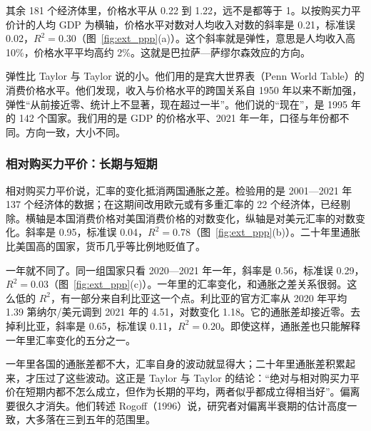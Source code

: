 其余 181 个经济体里，价格水平从 0.22 到 1.22，远不是都等于 1。以按购买力平价计的人均 GDP 为横轴，价格水平对数对人均收入对数的斜率是 0.21，标准误 0.02，$R^{2}=0.30$（图~\ref{fig:ext_ppp}(a)）。这个斜率就是弹性，意思是人均收入高 10\%，价格水平平均高约 2\%。这就是巴拉萨—萨缪尔森效应的方向。

弹性比 Taylor 与 Taylor 说的小。他们用的是宾大世界表（Penn World Table）的消费价格水平。他们发现，收入与价格水平的跨国关系自 1950 年以来不断加强，弹性“从前接近零、统计上不显著，现在超过一半”。他们说的“现在”，是 1995 年的 142 个国家\cite{taylor2004}。我们用的是 GDP 的价格水平、2021 年一年，口径与年份都不同。方向一致，大小不同。

\subsubsection{相对购买力平价：长期与短期}
相对购买力平价说，汇率的变化抵消两国通胀之差。检验用的是 2001—2021 年 137 个经济体的数据；在这期间改用欧元或有多重汇率的 22 个经济体，已经剔除。横轴是本国消费价格对美国消费价格的对数变化，纵轴是对美元汇率的对数变化。斜率是 0.95，标准误 0.04，$R^{2}=0.78$（图~\ref{fig:ext_ppp}(b)）。二十年里通胀比美国高的国家，货币几乎等比例地贬值了。

一年就不同了。同一组国家只看 2020—2021 年一年，斜率是 0.56，标准误 0.29，$R^{2}=0.03$（图~\ref{fig:ext_ppp}(c)）\cite{wdi2026}。一年里的汇率变化，和通胀之差关系很弱。这么低的 $R^{2}$，有一部分来自利比亚这一个点。利比亚的官方汇率从 2020 年平均 1.39 第纳尔/美元调到 2021 年的 4.51，对数变化 1.18。它的通胀差却接近零。去掉利比亚，斜率是 0.65，标准误 0.11，$R^{2}=0.20$。即使这样，通胀差也只能解释一年里汇率变化的五分之一。

一年里各国的通胀差都不大，汇率自身的波动就显得大；二十年里通胀差积累起来，才压过了这些波动。这正是 Taylor 与 Taylor 的结论：“绝对与相对购买力平价在短期内都不怎么成立，但作为长期的平均，两者似乎都成立得相当好”。偏离要很久才消失。他们转述 Rogoff（1996）说，研究者对偏离半衰期的估计高度一致，大多落在三到五年的范围里\cite{taylor2004}。


